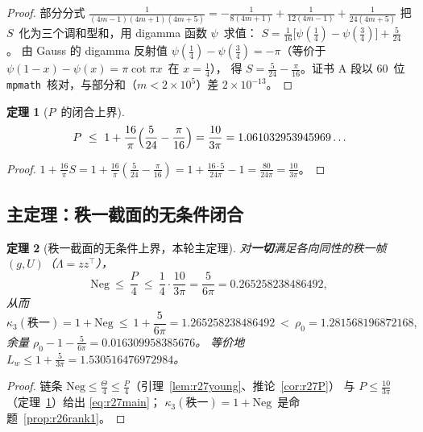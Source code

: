 \documentclass[UTF8,11pt]{ctexart}
\newtheorem{theorem}{定理}[section]
\theoremstyle{definition}
\newcommand{\Lam}{\Lambda}
\begin{document}
\begin{proof}
部分分式 $\frac1{(4m-1)(4m+1)(4m+5)}=-\frac1{8(4m+1)}+\frac1{12(4m-1)}+\frac1{24(4m+5)}$
把 $S$~化为三个调和型和，用 digamma 函数 $\psi$~求值：
$S=\frac1{16}\bigl[\psi(\tfrac14)-\psi(\tfrac34)\bigr]+\frac5{24}$。
由 Gauss 的 digamma 反射值 $\psi(\tfrac14)-\psi(\tfrac34)=-\pi$（等价于 $\psi(1-x)-\psi(x)=\pi\cot\pi x$~在 $x=\frac14$），
得 $S=\frac5{24}-\frac\pi{16}$。证书 A 段以 $60$~位 \texttt{mpmath}~核对，与部分和（$m<2\times10^5$）差 $2\times10^{-13}$。
\end{proof}

\begin{theorem}[$P$~的闭合上界]\label{thm:r27P}
\begin{equation}\label{eq:r27Pclosed}
P\ \le\ 1+\frac{16}\pi\Bigl(\frac5{24}-\frac\pi{16}\Bigr)=\frac{10}{3\pi}=1.061032953945969\ldots
\end{equation}
\end{theorem}

\begin{proof}
$1+\frac{16}\pi S=1+\frac{16}\pi(\frac5{24}-\frac\pi{16})=1+\frac{16\cdot5}{24\pi}-1=\frac{80}{24\pi}=\frac{10}{3\pi}$。
\end{proof}

\subsection{主定理：秩一截面的无条件闭合}\label{sec:r27:main}

\begin{theorem}[秩一截面的无条件上界，本轮主定理]\label{thm:r27main}
对\textbf{一切}满足各向同性的秩一帧 $(g,U)$（$\Lam=zz^\top$），
\begin{equation}\label{eq:r27main}
\mathrm{Neg}\ \le\ \frac P4\ \le\ \frac14\cdot\frac{10}{3\pi}=\frac5{6\pi}=0.265258238486492,
\end{equation}
从而
\begin{equation}\label{eq:r27concl}
\kappa_3(\text{秩一})=1+\mathrm{Neg}\ \le\ 1+\frac5{6\pi}=1.265258238486492\ <\ \rho_0=1.281568196872168,
\end{equation}
余量 $\rho_0-1-\frac5{6\pi}=0.016309958385676$。
等价地 $L_w\le1+\frac5{3\pi}=1.530516476972984$。
\end{theorem}

\begin{proof}
链条 $\mathrm{Neg}\le\frac\Theta4\le\frac P4$（引理~\ref{lem:r27young}、推论~\ref{cor:r27P}）
与 $P\le\frac{10}{3\pi}$（定理~\ref{thm:r27P}）给出 \eqref{eq:r27main}；
$\kappa_3(\text{秩一})=1+\mathrm{Neg}$~是命题~\ref{prop:r26rank1}。
\end{proof}
\end{document}
